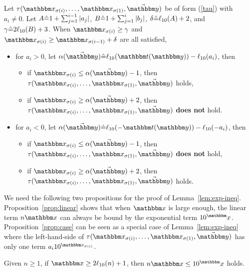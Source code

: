 \begin{lemma} \label{lem:exp-ineq}
Let $\tau(\ivarx_{\sigma(i)}, \ldots, \ivarx_{\sigma(1)}, \vec{\ivary})$ be of form (\ref{tau}) 
with $a_i \neq 0$. Let $A\hat{=} 1+\sum_{j=1}^{i-1}\vert a_j\vert$, 
$B \hat{=} 1+\sum_{j=1}^{i}\vert b_j\vert$, 
$\delta\hat{=}  \ell_{10}(A)+2$,
and $\gamma \hat{=} 2\ell_{10}(B)+3$. 
When $\ivarx_{\sigma(i)} \ge \gamma$ and  $\ivarx_{\sigma(i)} \ge \ivarx_{\sigma(i-1)} +\delta$ are all satisfied,
\begin{itemize}
    \item for $a_i > 0$, let $\alpha(\vec{\ivary}) \Def \ell_{10}(\iterm(\ivary))- \ell_{10}(a_i)$, then 
    \begin{itemize}
        \item if $\ivarx_{\sigma(i)} \le \alpha(\vec{\ivary})  -1$, then $\tau(\ivarx_{\sigma(i)}, \ldots, \ivarx_{\sigma(1)}, \vec{\ivary})$ holds,
        \item if $\ivarx_{\sigma(i)} \ge \alpha(\vec{\ivary})  +2$, then $\tau(\ivarx_{\sigma(i)}, \ldots, \ivarx_{\sigma(1)}, \vec{\ivary})$ \textbf{does not} hold.
    \end{itemize}
    \item for $a_i < 0$, let $\alpha(\vec{\ivary})  \Def \ell_{10}(-\iterm(\ivary))- \ell_{10}(-a_i)$, then 
    \begin{itemize}
        \item if $\ivarx_{\sigma(i)} \le \alpha(\vec{\ivary})  -1$, then $\tau(\ivarx_{\sigma(i)}, \ldots, \ivarx_{\sigma(1)}, \vec{\ivary})$ \textbf{does not} hold,
        \item if $\ivarx_{\sigma(i)} \ge \alpha(\vec{\ivary})  +2$, then $\tau(\ivarx_{\sigma(i)}, \ldots, \ivarx_{\sigma(1)}, \vec{\ivary})$ holds.
    \end{itemize}
\end{itemize}
\end{lemma}

We need the following two propositions for the proof of Lemma~\ref{lem:exp-ineq}. 
Proposition~\ref{prop:linear} shows that when $\ivarx$ is large enough, the linear term $n \ivarx$ can always be bound by the exponential term $10^\ivarx$. Proposition~\ref{prop:case} can be seen as a special case of Lemma~\ref{lem:exp-ineq} where the left-hand-side of $\tau(\ivarx_{\sigma(i)}, \ldots, \ivarx_{\sigma(1)}, \vec{\ivary})$ has only one term $a_i 10^{\ivarx_{\sigma(i)}}$. 

\begin{proposition} \label{prop:linear}
Given $n\ge 1$, if $\ivarx \ge 2\ell_{10}(n)+1$, then 
$n \ivarx  \le 10^\ivarx$ holds.
\end{proposition}

